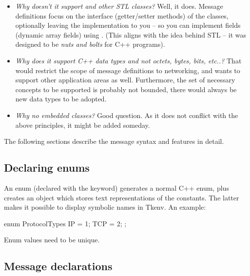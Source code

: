 \begin{itemize}
  \item{\textit{Why doesn't it support  and other STL classes?}
     Well, it does. Message definitions focus on the interface
     (getter/setter methods) of the classes, optionally leaving the implementation
     to you -- so you can implement fields (dynamic array fields)
     using .
     (This aligns with the idea behind STL -- it was designed to be
     \textit{nuts and bolts} for C++ programs).}
  \item{\textit{Why does it support C++ data types and not octets,
     bytes, bits, etc..?}
     That would restrict the scope of message definitions to networking,
     and {\opp} wants to support other application areas as well.
     Furthermore, the set of necessary concepts to be supported is
     probably not bounded, there would always be new data types to
     be adopted.}
  \item{\textit{Why no embedded classes?} Good question. As it does not
     conflict with the above principles, it might be added someday.}
\end{itemize}



The following sections describe the message syntax and features in detail.


\subsection{Declaring enums}

An enum (declared with the  keyword) generates a normal C++
enum, plus creates an object which stores text representations of the
constants. The latter makes it possible to display symbolic names in Tkenv.
An example:

\begin{msg}
enum ProtocolTypes
{
   IP = 1;
   TCP = 2;
};
\end{msg}

Enum values need to be unique.


%

\subsection{Message declarations}

